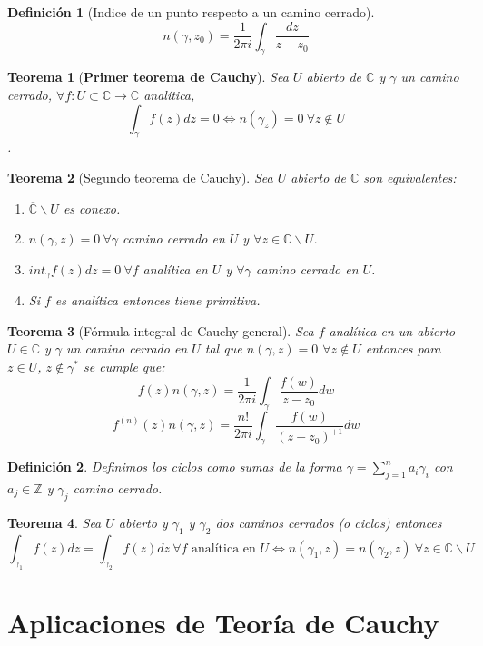 \documentclass[12pt]{book}
\newtheorem{defi}{Definición}[chapter]
\newtheorem{theorem}{Teorema}[chapter]
\newcommand{\C}{\mathbb{C}}
\newcommand{\Z}{\mathbb{Z}}
\newcommand{\f}{f: U\subset \C \longrightarrow \C}
\begin{document}
\begin{defi}[Indice de un punto respecto a un camino cerrado]
$$n(\gamma,z_0) = \frac{1}{2\pi i}\int_\gamma \frac{dz}{z-z_0}$$
\end{defi}


\begin{theorem}[\textbf{Primer teorema de Cauchy}]
Sea $U$ abierto de $\C$ y $\gamma$ un camino cerrado, $\forall \f$ analítica, $$\int_\gamma f(z)dz = 0 \Leftrightarrow n(\gamma_z)=0 \ \forall z \notin U$$.
\end{theorem} 
\begin{theorem}[Segundo teorema de Cauchy]
Sea $U$ abierto de $\C$ son equivalentes:
\begin{enumerate}
\item $\overline{\C}\backslash U$ es conexo.
\item $n(\gamma,z)=0 \ \forall \gamma$ camino cerrado en $U$ y $\forall z \in \C\backslash U$.
\item $int_\gamma f(z)dz = 0 \ \forall f$ analítica en $U$ y $\forall \gamma$ camino cerrado en $U$.
\item Si $f$ es analítica entonces tiene primitiva.
\end{enumerate}
\end{theorem}


\begin{theorem}[Fórmula integral de Cauchy general]
Sea $f$ analítica en un abierto $U\in\C$ y $\gamma$ un camino cerrado en $U$ tal que $n(\gamma,z)=0$ $\forall z \notin U$ entonces para $z \in U$, $z \notin\gamma^*$ se cumple que:
$$f(z)n(\gamma,z) = \frac{1}{2\pi i}\int_\gamma \frac{f(w)}{z-z_0}dw$$
$$f^{(n)}(z)n(\gamma,z) = \frac{n!}{2\pi i}\int_\gamma \frac{f(w)}{(z-z_0)^{+1}}dw$$
\end{theorem}

\begin{defi}
Definimos los ciclos como sumas de la forma $\gamma = \sum_{j=1}^n a_i\gamma_i$ con $a_j \in\Z$ y $\gamma_j$ camino cerrado.
\end{defi}

\begin{theorem}
Sea $U$ abierto y $\gamma_1$ y $\gamma_2$ dos caminos cerrados (o ciclos) entonces
$$\int_{\gamma_1} f(z)dz = \int_{\gamma_2} f(z)dz\ \forall f \text{ analítica en }U \Leftrightarrow n(\gamma_1,z) = n(\gamma_2,z) \ \forall z\in \C\backslash U$$
\end{theorem}

\section{Aplicaciones de Teoría de Cauchy}
\end{document}
